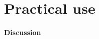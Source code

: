 \section{Practical use}

\paragraph{Discussion}

\begin{comment}
this is chapter eight devoted to applicative hunters and pro functors
the first part will be practical examples main motivation for applicati
factors comes from considering kinetic computations or computations
in the factor block as I color in case when effects are independent
and competitive or in case when these effects could be executed in
parallel while the result is still correct here is an example consider
a portion of a functor block or a for yield block in Scala that looks
like this there are three future values and X will be waiting until
with this future value is ready imagine that these are some long-running
computations and after these three lines we can use XYZ and further
computations any further computations will be waiting for these three
futures now if we write code like this then these three futures will
be created sequentially that is first this future will be created
and scheduled on some thread and then when it's done you get the value
X and then this second future will be created and scheduled even though
it doesn't use the value X but the monadic block or the for yield
block or the Thunder block whatever you want to call it I call it
a factor block the Thunder block is such that every generator line
locks everything else until it's done so in the future we'll be created
one at a time and so obviously this is not optimal if you translate
this into flat map code and map that's the code so you have a first
future but to which you append this flat map so you schedule it is
further computation only when the first computation is ready the second
future will be then started and this will be waiting until the second
future is ready and then the third future will be started and this
will be ready will be waiting until the third future is ready clearly
this is not optimal would like to parallelize these things and we
have seen in a previous tutorial that a very easy way of paralyzing
such computations is to create the futures before starting the factor
block but this is actually a specific feature of scholar where futures
already start computing when you create them there is no separate

\end{comment}
